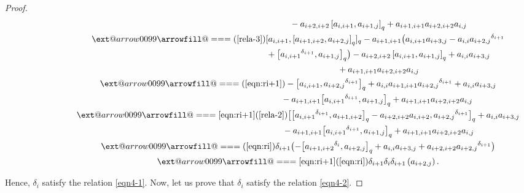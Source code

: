 \documentclass[10pt,a4paper]{amsart}
\makeatletter
\def\x@arrow{\DOTSB\Relbar}
\def\xlongequalsignfill@{\arrowfill@\x@arrow\Relbar\x@arrow}
\providecommand{\xlongequal}[2][]{%
	\ext@arrow 0099\xlongequalsignfill@{#1}{#2}}
\numberwithin{equation}{section}
\def\lr#1{\left[#1\right]}
\def\lrb#1{\left(#1\right)}
\def\d{\delta}
\makeatother
\begin{document}
\begin{proof}
\begin{gather*}
 \phantom{ \d_i\d_{i+1}\d_i\lrb{a_{i+2,j}}\xlongequal{\qquad}}{} -a_{i+2,i+2}\lr{a_{i,i+1}, a_{i+1,j}}_q+a_{i+1,i+1}a_{i+2,i+2}a_{i,j}\\
 \phantom{ \d_i\d_{i+1}\d_i\lrb{a_{i+2,j}}}{}\xlongequal{\lrb{\ref{rela-3}}} [a_{i,i+1},\lr{a_{i+1,i+2}, a_{i+2,j}}_q]_q -a_{i+1,i+1} \bigl(a_{i,i+1}a_{i+3,j} -a_{i,i}{a_{i+2,j}}^{\d_{i+1}} \\
 \phantom{ \d_i\d_{i+1}\d_i\lrb{a_{i+2,j}}\xlongequal{\qquad}}{} + \bigl[{a_{i,i+1}}^{\d_{i+1}}, a_{i+1,j} \bigr]_q \bigr)-a_{i+2,i+2}\lr{a_{i,i+1}, a_{i+1,j}}_q +a_{i,i}a_{i+3,j} \\
 \phantom{ \d_i\d_{i+1}\d_i\lrb{a_{i+2,j}}\xlongequal{\qquad}}{} +a_{i+1,i+1}a_{i+2,i+2}a_{i,j}\\
 \phantom{ \d_i\d_{i+1}\d_i\lrb{a_{i+2,j}}}{}\xlongequal{\lrb{\ref{eqn:ri+1}}} -\bigl[a_{i,i+1},{a_{i+2,j}}^{\d_{i+1}}\bigr]_q +a_{i,i}a_{i+1,i+1}{a_{i+2,j}}^{\d_{i+1}} +a_{i,i}a_{i+3,j} \\
 \phantom{ \d_i\d_{i+1}\d_i\lrb{a_{i+2,j}}\xlongequal{\qquad}\!\!}{} -a_{i+1,i+1}\bigl[ {a_{i,i+1}}^{\d_{i+1}}, a_{i+1,j}\bigr]_q+a_{i+1,i+1}a_{i+2,i+2}a_{i,j}\\
 \phantom{ \d_i\d_{i+1}\d_i\lrb{a_{i+2,j}}}{} \xlongequal[\eqref{eqn:ri+1}]{\lrb{\ref{rela-2}}} \bigl[\bigl[{a_{i,i+1}}^{\d_{i+1}}, a_{i+1,i+2}\bigr]_q-a_{i+2,i+2}a_{i,i+2}, {a_{i+2,j}}^{\d_{i+1}}\bigr]_q +a_{i,i}a_{i+3,j} \\
 \phantom{ \d_i\d_{i+1}\d_i\lrb{a_{i+2,j}}\xlongequal{\qquad}}{} -a_{i+1,i+1}\bigl[ {a_{i,i+1}}^{\d_{i+1}}, a_{i+1,j}\bigr]_q +a_{i+1,i+1}a_{i+2,i+2}a_{i,j}\\
 \phantom{ \d_i\d_{i+1}\d_i\lrb{a_{i+2,j}}}{} \xlongequal{\lrb{\ref{eqn:ri}}} \d_{i+1}\bigl(-\bigl[{a_{i+1,i+2}}^{\d_{i}}, a_{i+2,j}\bigr]_q+a_{i,i}a_{i+3,j}+a_{i+2,i+2} {a_{i+2,j}}^{\d_{i+1}}\bigr)\\
 \phantom{ \d_i\d_{i+1}\d_i\lrb{a_{i+2,j}}}{}\xlongequal[\eqref{eqn:ri+1}]{\lrb{\ref{eqn:ri}}} \d_{i+1}\d_i\d_{i+1}
\lrb{a_{i+2,j}}.
\end{gather*}

Hence, $\d_i$ satisfy the relation \eqref{eqn4-1}.
Now, let us prove that $\d_i$ satisfy the relation \eqref{eqn4-2}.


\end{proof}
\end{document}
